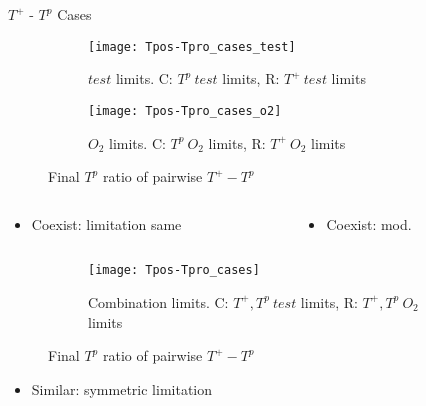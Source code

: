 \begin{frame}[allowframebreaks]{$T^+$ - $T^p$ Cases}
  \begin{figure}[h]
    \centering
    \begin{subfigure}[b]{0.48\textwidth}
      \centering
      \texttt{[image: Tpos-Tpro\_cases\_test]}
      \caption{$test$ limits. C: $T^p\ test$ limits, R: $T^+\ test$ limits}
    \end{subfigure}
    \begin{subfigure}[b]{0.48\textwidth}
      \centering
      \texttt{[image: Tpos-Tpro\_cases\_o2]}
      \caption{$O_2$ limits. C: $T^p\ O_2$ limits, R: $T^+\ O_2$ limits}
    \end{subfigure}
    \caption{Final $T^p$ ratio of pairwise $T^+ - T^p$}
  \end{figure}
  \begin{columns}
    \begin{column}{0.5\textwidth}
      \begin{itemize}
        \item Coexist: limitation same
      \end{itemize}
    \end{column}
    \begin{column}{0.5\textwidth}
      \begin{itemize}
        \item Coexist: mod.
      \end{itemize}
    \end{column}
  \end{columns}
  \framebreak
  \begin{figure}[h]\ContinuedFloat
    \centering
    \begin{subfigure}[b]{\textwidth}
      \centering
      \texttt{[image: Tpos-Tpro\_cases]}
      \caption{Combination limits. C: $T^+,T^p\ test$ limits, R: $T^+,T^p\ O_2$ limits}
    \end{subfigure}
    \caption{Final $T^p$ ratio of pairwise $T^+ - T^p$}
  \end{figure}
  \begin{itemize}
    \item Similar: symmetric limitation
  \end{itemize}
\end{frame}

